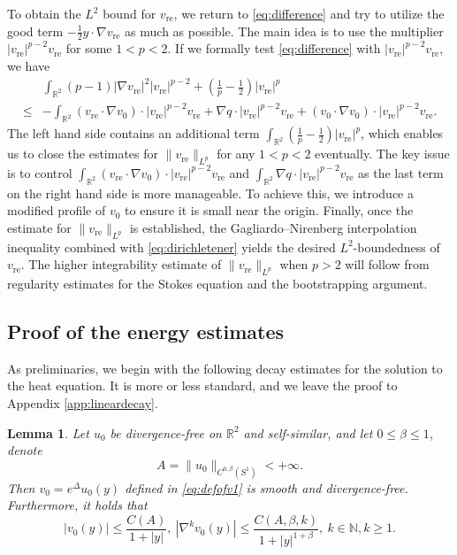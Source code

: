 \documentclass[12pt]{amsart}
\numberwithin{equation}{section}              %
\newtheorem{lemma}{Lemma}[section]
\theoremstyle{remark}
\begin{document}
	To obtain the $L^2$ bound for $v_{\text{re}}$, we return to  \eqref{eq:difference} and  try to utilize the good term $-\frac{1}{2}y\cdot \nabla v_{\text{re}}$ as much as possible. The main idea is to use the multiplier $|v_{\text{re}}|^{p-2}v_{\text{re}}$ for some $1<p<2$.
	If we formally test \eqref{eq:difference} with $|v_{\text{re}}|^{p-2}v_{\text{re}}$, we have 
	\begin{equation*}
		\begin{aligned}
			&\int_{\mathbb{R}^2} (p-1)|\nabla v_{\text{re}}|^2 |v_{\text{re}}|^{p-2}  + \left(\frac{1}{p}-\frac{1}{2}\right) |v_{\text{re}}|^{p} \\
			\leq& - \int_{\mathbb{R}^2}  (v_{\text{re}}\cdot \nabla  v_0)\cdot |v_{\text{re}}|^{p-2}v_{\text{re}} + \nabla q\cdot |v_{\text{re}}|^{p-2}v_{\text{re}} + ( v_0\cdot \nabla  v_0)\cdot |v_{\text{re}}|^{p-2} v_{\text{re}}.
		\end{aligned}
	\end{equation*}
	The left hand side contains an additional term $\int_{\mathbb{R}^2} \left(\frac{1}{p}-\frac{1}{2}\right) |v_{\text{re}}|^{p} $, which 
	enables us to close the estimates for
	$\|v_{\text{re}}\|_{L^{p}}$ for any $1<p<2$ eventually. 
	The key issue is to control $\int_{\mathbb{R}^2}  (v_{\text{re}}\cdot \nabla  v_0)\cdot |v_{\text{re}}|^{p-2}v_{\text{re}} $  and $\int_{\mathbb{R}^2}  \nabla q\cdot |v_{\text{re}}|^{p-2}v_{\text{re}}$  as the last term on the right hand side is more manageable.
	To achieve this, we introduce a modified profile of $v_0$ to ensure it is small near the origin. Finally, once the estimate for $\|v_{\text{re}}\|_{L^{p}}$  is established, the Gagliardo–Nirenberg interpolation inequality combined with \eqref{eq:dirichletener} yields the desired $L^2$-boundedness of $v_{\text{re}}$. The higher integrability estimate of $\|v_{\text{re}}\|_{L^{p}}$ when $p>2$ will follow from regularity estimates for the Stokes equation and the bootstrapping argument.
	
	
	
	
	\subsection{Proof of the energy estimates}
	As preliminaries,
	we begin with the following decay estimates for the solution to the heat equation.  It is more or less standard, and we leave the proof to Appendix \ref{app:lineardecay}.
	\begin{lemma}\label{lem:lineardecay}
		Let $u_0$ be divergence-free on $\mathbb{R}^2$ and self-similar, and let $0\leq \beta\leq 1$, denote
		\begin{equation*}
			A= \|u_0\|_{C^{0, \beta}(S^1)} 		<+\infty.
		\end{equation*}
		Then  $ v_0 = e^{\Delta}u_0(y)$ defined in \eqref{eq:defofv1} is smooth and divergence-free.
		Furthermore, it holds that 
		\begin{equation}\label{eq:scale-invbou-2}
			|  v_0 (y)|\leq \frac{C(A)}{1+|y|}, ~
			|\nabla^k  v_0 (y)|\leq \frac{C(A,\beta, k)}{1+|y|^{1+\beta}}, ~ k\in \mathbb{N}, k\geq 1.
		\end{equation}
	\end{lemma}
	
\end{document}
